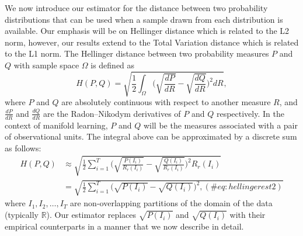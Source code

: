 \documentclass{article}
\begin{document}
We now introduce our estimator for the distance between two probability
distributions that can be used when a sample drawn from each
distribution is available. Our emphasis will be on Hellinger distance
which is related to the L2 norm, however, our results extend to the
Total Variation distance which is related to the L1 norm. The Hellinger
distance between two probability measures \(P\) and \(Q\) with sample
space \(\Omega\) is defined as \begin{equation}\label{eq:hellingerdef1}
H(P , Q) = \sqrt{ \frac{1}{2} \int_\Omega \bigg( \sqrt{\frac{dP}{dR}} - \sqrt{\frac{dQ}{dR}} \bigg)^2 dR} ,
\end{equation} where \(P\) and \(Q\) are absolutely continuous with
respect to another measure \(R\), and \(\frac{dP}{dR}\) and
\(\frac{dQ}{dR}\) are the Radon--Nikodym derivatives of \(P\) and \(Q\)
respectively. In the context of manifold learning, \(P\) and \(Q\) will
be the measures associated with a pair of observational units. The
integral above can be approximated by a discrete sum as follows:
\begin{align}
H(P,Q) &\approx \sqrt{\frac{1}{2} \sum_{i=1}^{T} \bigg( \sqrt{\frac{P(I_i)}{R_r(I_i)}} - \sqrt{\frac{Q(I_i)}{R_r(I_i)}} \bigg)^2 R_r(I_i)} \\
&= \sqrt{\frac{1}{2} \sum_{i=1}^{T} \bigg( \sqrt{P(I_i)} - \sqrt{Q(I_i)} \bigg)^2, (\#eq:hellingerest2)}
\end{align} where \(I_1, I_2,\dots, I_T\) are non-overlapping partitions
of the domain of the data (typically \(\mathbb{R}\)). Our estimator
replaces \(\sqrt{P(I_i)}\) and \(\sqrt{Q(I_i)}\) with their empirical
counterparts in a manner that we now describe in detail.
\end{document}
